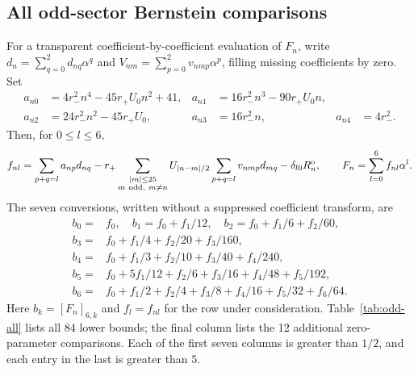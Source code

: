 \subsection{All odd-sector Bernstein comparisons}
For a transparent coefficient-by-coefficient evaluation of $F_n$, write
$d_n=\sum_{q=0}^2d_{nq}\alpha^q$ and
$V_{nm}=\sum_{p=0}^2v_{nmp}\alpha^p$, filling missing coefficients by zero.
Set
\begin{align*}
 a_{n0}&=4r_-^2n^4-45r_+U_0n^2+41,&
 a_{n1}&=16r_-^2n^3-90r_+U_0n,\\
 a_{n2}&=24r_-^2n^2-45r_+U_0,&
 a_{n3}&=16r_-^2n,&a_{n4}&=4r_-^2.
\end{align*}
Then, for $0\le l\le6$,
\[
 f_{nl}=\sum_{p+q=l}a_{np}d_{nq}
 -r_+\sum_{\substack{|m|\le25\\m\ {\rm odd},\ m\ne n}}
 U_{|n-m|/2}\sum_{p+q=l}v_{nmp}d_{mq}
 -\delta_{l0}R_n^{\rm o},
 \qquad F_n=\sum_{l=0}^6f_{nl}\alpha^l.
\]
The seven conversions, written without a suppressed coefficient transform, are
\[
\begin{aligned}
 b_0={}&f_0,\quad b_1=f_0+f_1/12,\quad
 b_2=f_0+f_1/6+f_2/60,\\
 b_3={}&f_0+f_1/4+f_2/20+f_3/160,\\
 b_4={}&f_0+f_1/3+f_2/10+f_3/40+f_4/240,\\
 b_5={}&f_0+5f_1/12+f_2/6+f_3/16+f_4/48+f_5/192,\\
 b_6={}&f_0+f_1/2+f_2/4+f_3/8+f_4/16+f_5/32+f_6/64.
\end{aligned}
\]
Here $b_k=[F_n]_{6,k}$ and $f_l=f_{nl}$ for the row under consideration.
Table~\ref{tab:odd-all} lists all 84 lower bounds; the final column lists the
12 additional zero-parameter comparisons. Each of the first seven columns is
greater than $1/2$, and each entry in the last is greater than $5$.

